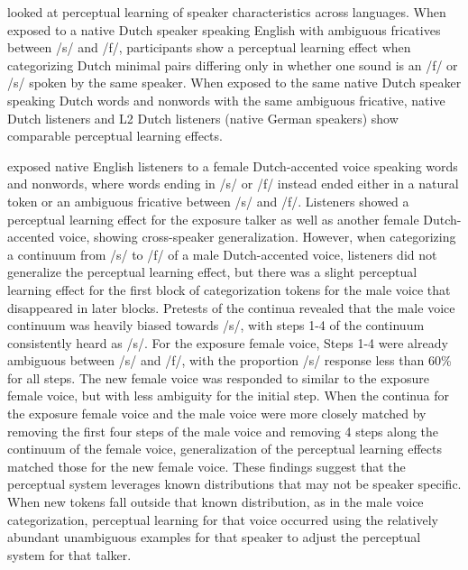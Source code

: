 \citet{Reinisch2013} looked at perceptual learning of speaker characteristics across languages.  
When exposed to a native Dutch speaker speaking English with ambiguous fricatives between /s/ and /f/, participants show a perceptual learning effect when categorizing Dutch minimal pairs differing only in whether one sound is an /f/ or /s/ spoken by the same speaker.  
When exposed to the same native Dutch speaker speaking Dutch words and nonwords with the same ambiguous fricative, native Dutch listeners and L2 Dutch listeners (native German speakers) show comparable perceptual learning effects.

\citet{Reinisch2013a} exposed native English listeners to a female Dutch-accented voice speaking words and nonwords, where words ending in /s/ or /f/ instead ended either in a natural token or an ambiguous fricative between /s/ and /f/.  
Listeners showed a perceptual learning effect for the exposure talker as well as another female Dutch-accented voice, showing cross-speaker generalization.  
However, when categorizing a continuum from /s/ to /f/ of a male Dutch-accented voice, listeners did not generalize the perceptual learning effect, but there was a slight perceptual learning effect for the first block of categorization tokens for the male voice that disappeared in later blocks.  
Pretests of the continua revealed that the male voice continuum was heavily biased towards /s/, with steps 1-4 of the continuum consistently heard as /s/. 
 For the exposure female voice, Steps 1-4 were already ambiguous between /s/ and /f/, with the proportion /s/ response less than 60\% for all steps.  
The new female voice was responded to similar to the exposure female voice, but with less ambiguity for the initial step.  
When the continua for the exposure female voice and the male voice were more closely matched by removing the first four steps of the male voice and removing 4 steps along the continuum of the female voice, generalization of the perceptual learning effects matched those for the new female voice.  
These findings suggest that the perceptual system leverages known distributions that may not be speaker specific.  
When new tokens fall outside that known distribution, as in the male voice categorization, perceptual learning for that voice occurred using the relatively abundant unambiguous examples for that speaker to adjust the perceptual system for that talker.

